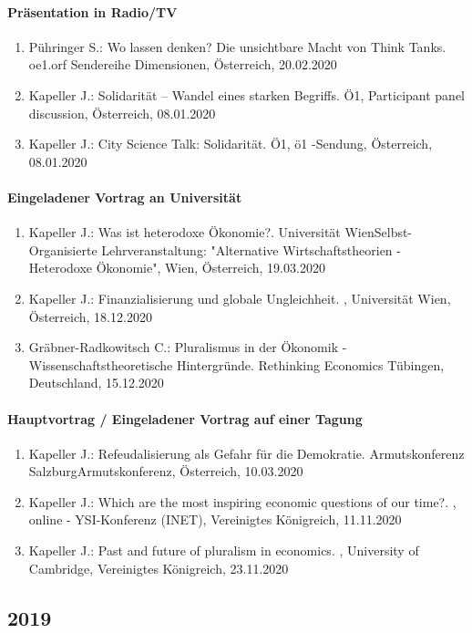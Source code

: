 \paragraph{Präsentation in Radio/TV}
\begin{enumerate}
	\item Pühringer S.: Wo lassen denken? Die unsichtbare Macht von Think Tanks. oe1.orf Sendereihe Dimensionen, Österreich, 20.02.2020
	\item Kapeller J.: Solidarität – Wandel eines starken Begriffs. Ö1, Participant panel discussion, Österreich, 08.01.2020
	\item Kapeller J.: City Science Talk: Solidarität. Ö1, ö1  -Sendung, Österreich, 08.01.2020
\end{enumerate}
\paragraph{Eingeladener Vortrag an Universität}
\begin{enumerate}
	\item Kapeller J.: Was ist heterodoxe Ökonomie?. Universität WienSelbst-Organisierte Lehrveranstaltung: "Alternative Wirtschaftstheorien - Heterodoxe Ökonomie", Wien, Österreich, 19.03.2020
	\item Kapeller J.: Finanzialisierung und globale Ungleichheit. , Universität Wien, Österreich, 18.12.2020
	\item Gräbner-Radkowitsch C.: Pluralismus in der Ökonomik - Wissenschaftstheoretische Hintergründe. Rethinking Economics Tübingen, Deutschland, 15.12.2020
\end{enumerate}
\paragraph{Hauptvortrag / Eingeladener Vortrag auf einer Tagung}
\begin{enumerate}
	\item Kapeller J.: Refeudalisierung als Gefahr für die Demokratie. Armutskonferenz SalzburgArmutskonferenz, Österreich, 10.03.2020
	\item Kapeller J.: Which are the most inspiring economic questions of our time?. , online - YSI-Konferenz (INET), Vereinigtes Königreich, 11.11.2020
	\item Kapeller J.: Past and future of pluralism in economics. , University of Cambridge, Vereinigtes Königreich, 23.11.2020
\end{enumerate}
\subsection*{2019}

